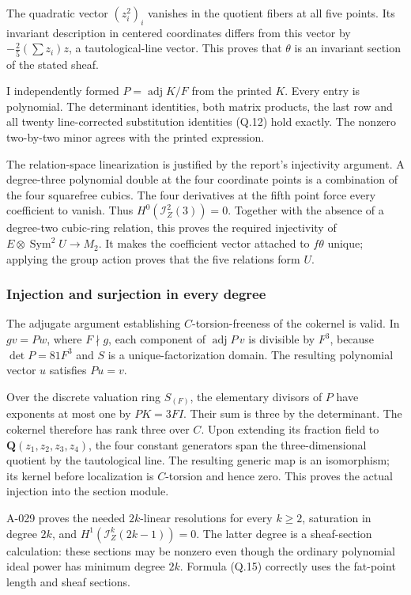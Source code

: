 \documentclass[
  10pt,
]{article}
\begin{document}
The quadratic vector \((z_i^2)_i\) vanishes in the quotient fibers at
all five points. Its invariant description in centered coordinates
differs from this vector by \(-\frac25(\sum z_i)z\), a tautological-line
vector. This proves that \(\theta\) is an invariant section of the
stated sheaf.

I independently formed \(P=\operatorname{adj}K/F\) from the printed
\(K\). Every entry is polynomial. The determinant identities, both
matrix products, the last row and all twenty line-corrected substitution
identities (Q.12) hold exactly. The nonzero two-by-two minor agrees with
the printed expression.

The relation-space linearization is justified by the report's
injectivity argument. A degree-three polynomial double at the four
coordinate points is a combination of the four squarefree cubics. The
four derivatives at the fifth point force every coefficient to vanish.
Thus \(H^0(\mathcal I_Z^2(3))=0\). Together with the absence of a
degree-two cubic-ring relation, this proves the required injectivity of
\(E\otimes\operatorname{Sym}^2U\to M_2\). It makes the coefficient
vector attached to \(f\theta\) unique; applying the group action proves
that the five relations form \(U\).

\subsubsection{Injection and surjection in every
degree}\label{injection-and-surjection-in-every-degree}

The adjugate argument establishing \(C\)-torsion-freeness of the
cokernel is valid. In \(gv=Pw\), where \(F\nmid g\), each component of
\(\operatorname{adj}P\,v\) is divisible by \(F^3\), because
\(\det P=81F^3\) and \(S\) is a unique-factorization domain. The
resulting polynomial vector \(u\) satisfies \(Pu=v\).

Over the discrete valuation ring \(S_{(F)}\), the elementary divisors of
\(P\) have exponents at most one by \(PK=3FI\). Their sum is three by
the determinant. The cokernel therefore has rank three over \(C\). Upon
extending its fraction field to \(\mathbf Q(z_1,z_2,z_3,z_4)\), the four
constant generators span the three-dimensional quotient by the
tautological line. The resulting generic map is an isomorphism; its
kernel before localization is \(C\)-torsion and hence zero. This proves
the actual injection into the section module.

A-029 proves the needed \(2k\)-linear resolutions for every \(k\ge2\),
saturation in degree \(2k\), and \(H^1(\mathcal I_Z^k(2k-1))=0\). The
latter degree is a sheaf-section calculation: these sections may be
nonzero even though the ordinary polynomial ideal power has minimum
degree \(2k\). Formula (Q.15) correctly uses the fat-point length and
sheaf sections.
\end{document}
